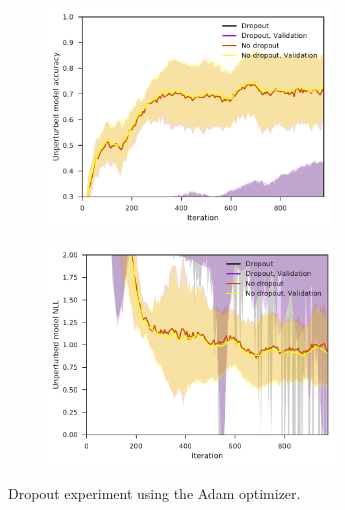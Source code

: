 \begin{figure}[tbp!]
    \begin{subfigure}[b]{0.49\textwidth}
        \centering
        \includegraphics[height=5.8cm]{graphics/E023-DO-Adam-analysis/accuracy_unp-all-series-mean-sd.pdf}
        \caption{}
        \label{fig: Theory: E023-DO-Adam-analysis/accuracy_unp-all-series-mean-sd}
    \end{subfigure}
    \hfill
    \begin{subfigure}[b]{0.49\textwidth}
        \centering
        \includegraphics[height=5.8cm]{graphics/E023-DO-Adam-analysis/return_unp-all-series-mean-sd.pdf}
        \caption{}
        \label{fig: Theory: E023-DO-Adam-analysis/return_unp-all-series-mean-sd}
    \end{subfigure}
    \vspace{-0.2cm}
    \caption{Dropout experiment using the Adam optimizer.}
    \label{fig: Theory: E023-DO-Adam-analysis}
\end{figure}
